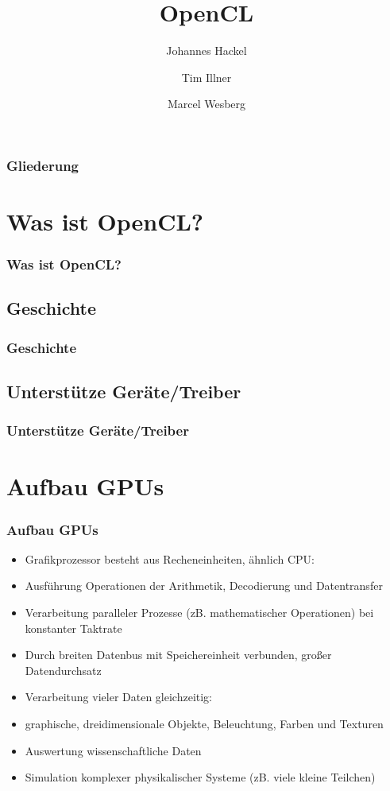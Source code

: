 \documentclass{beamer}
\author{Johannes Hackel \and Tim Illner \and Marcel Wesberg}
\title{OpenCL}
\begin{document}
\begin{frame}
\titlepage
\end{frame}

\begin{frame}
\frametitle{Gliederung}
\tableofcontents
\end{frame}

\section{Was ist OpenCL?}
\begin{frame}[fragile]
\frametitle{Was ist OpenCL?}
\end{frame}
\subsection{Geschichte}
\begin{frame}[fragile]
\frametitle{Geschichte}
\end{frame}
\subsection{Unterstütze Geräte/Treiber}
\begin{frame}[fragile]
\frametitle{Unterstütze Geräte/Treiber}
\end{frame}

\section{Aufbau GPUs}
\begin{frame}[fragile]
\frametitle{Aufbau GPUs}
\begin{itemize}
\item Grafikprozessor besteht aus Recheneinheiten, ähnlich CPU:
\item Ausführung Operationen der Arithmetik, Decodierung und Datentransfer
\item Verarbeitung paralleler Prozesse (zB. mathematischer Operationen) bei konstanter Taktrate
\item Durch breiten Datenbus mit Speichereinheit verbunden, großer Datendurchsatz
\item Verarbeitung vieler Daten gleichzeitig:
\item graphische, dreidimensionale Objekte, Beleuchtung, Farben und Texturen
\item Auswertung wissenschaftliche Daten
\item Simulation komplexer physikalischer Systeme (zB. viele kleine Teilchen)
\end{itemize}
\end{frame}
\end{document}
